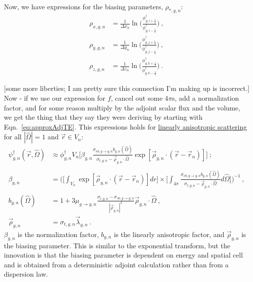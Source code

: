 \documentclass[12pt,twoside]{article}
\newcommand{\vOmega}{\ensuremath{\hat{\Omega}}}
\begin{document}
Now, we have expressions for the biasing parameters, $\rho_{*,g,n}$: 
\begin{align}
  \rho_{x,g,n} &= \frac{1}{\Delta x_n} \ln \biggl(\frac{\phi^{\dagger}_{g, i + \frac{1}{2}}}{\phi^{\dagger}_{g, i - \frac{1}{2}}} \biggr) \:, \label{eq:paramx}\\
  \rho_{y,g,n} &= \frac{1}{\Delta y_n} \ln \biggl(\frac{\phi^{\dagger}_{g, j + \frac{1}{2}}}{\phi^{\dagger}_{g, j - \frac{1}{2}}} \biggr) \:, \label{eq:paramy}\\
  \rho_{z,g,n} &= \frac{1}{\Delta z_n} \ln \biggl(\frac{\phi^{\dagger}_{g, k + \frac{1}{2}}}{\phi^{\dagger}_{g, k - \frac{1}{2}}} \biggr) \:. 
  \label{eq:paramz}
\end{align}

[some more liberties; I am pretty sure this connection I'm making up is incorrect.]\\
Now - if we use our expression for $f$, cancel out some $4\pi$s, add a normalization factor, and for some reason multiply by the adjoint scalar flux and the volume, we get the thing that they say they were deriving by starting with Eqn.~\eqref{eq:approxAdjTE}.
This expressions holds for \underline{linearly anisotropic scattering} for all $|\vOmega| = 1$ and $\vec{r} \in V_n$:
\begin{align}
  \psi^{\dagger}_{g,n}(\vec{r}, \vOmega) &\approx \phi^{\dagger}_{g,n} V_n \biggl[ \beta_{g,n} \frac{\sigma_{s0,g \rightarrow g, n} b_{g,n}(\vOmega)}{\sigma_{t,g,n} - \vec{\rho}_{g,n} \cdot \vOmega} \exp[\vec{\rho}_{g,n} \cdot (\vec{r} - \vec{r}_n)]\biggr] \:; 
  \label{eq:approxPsiAdj}\\
  &\nonumber\\
  \beta_{g,n} &= \biggl( \biggl[ \int_{V_n} \exp[\vec{\rho}_{g,n} \cdot (\vec{r} - \vec{r}_n)] dr \biggr] \times 
  \biggl[ \int_{4 \pi} \frac{\sigma_{s0,g \rightarrow g, n} b_{g,n}(\vOmega)}{\sigma_{t,g,n} - \vec{\rho}_{g,n} \cdot \vOmega} d\vOmega \biggr] \biggr)^{-1} \:, 
  \label{eq:normFact} \\
  &\nonumber\\
  b_{g,n}(\vOmega) &= 1 + 3 \mu_{g \rightarrow g, n} \frac{\sigma_{t,g,n} - \sigma_{s0,g \rightarrow g, n}}{|\vec{\rho}_{g,n}|^2} \vec{\rho}_{g,n} \cdot \vOmega \:, 
  \label{eq:linIsoFact} \\
  \vec{\rho}_{g,n} &= \sigma_{t,g,n} \vec{\lambda}_{g,n} \:.
  \label{eq:biasingParam}
\end{align} 
$\beta_{g,n}$ is the normalization factor, $b_{g,n}$ is the linearly anisotropic factor, and $\vec{\rho}_{g,n}$ is the biasing parameter. This is similar to the exponential transform, but the innovation is that the biasing parameter is dependent on energy and spatial cell and is obtained from a deterministic adjoint calculation rather than from a dispersion law. 
\end{document}
